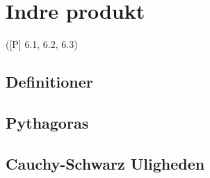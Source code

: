 \newpage
\chapter{Indre produkt}
([P] 6.1, 6.2, 6.3)

\section{Definitioner}

\section{Pythagoras}


\section{Cauchy-Schwarz Uligheden}

